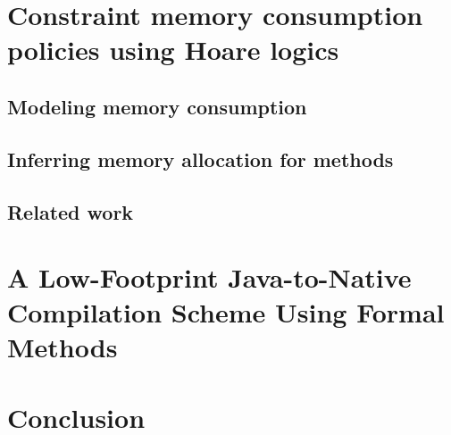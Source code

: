 \documentclass[book,10pt]{book}
\begin{document}
\chapter{Constraint memory consumption policies using Hoare logics}
       
       \lstset{numbers=none}
       
       \section{Modeling memory consumption}\label{sec:verif}
       
       \section{Inferring memory allocation for methods}\label{sec:infer}
       
       \section{Related work}\label{sec:rel}
       

\chapter{A Low-Footprint Java-to-Native Compilation Scheme Using Formal Methods}
      \lstset{frameround=tttt}
      
      
      
      
      
      
       
       
      
 

\chapter{Conclusion}

\appendix
  


\end{document}
